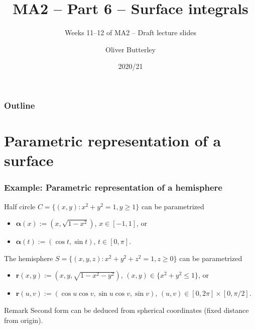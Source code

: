 \documentclass[aspectratio=169]{beamer}
\title{MA2 -- Part 6 -- Surface integrals}
\subtitle{Weeks 11--12 of MA2 -- Draft lecture slides}
\author[]{Oliver Butterley}
\institute{University of Rome Tor Vergata}
\date{2020/21}
\newcommand{\rr}{\mathbf{r}}
\newcommand{\aalpha}{\boldsymbol{\alpha}}
\newcommand{\cover}[1]{{#1}}
\begin{document}
\frame{\titlepage}

\begin{frame}
    \frametitle{Outline}
    \tableofcontents
\end{frame}


\section{Parametric representation of a surface}

\begin{frame}
    \frametitle{Example: Parametric representation of a hemisphere}


    Half circle \(C=\{(x,y): x^2 + y^2=1, y\geq 1\}\) can be parametrized
    \begin{itemize}
        \item \(\aalpha(x):= (x,\sqrt{1-x^2})\), \(x\in [-1,1]\), or
        \item \(\aalpha(t):= (\cos t, \sin t)\), \(t\in [0,\pi]\).
    \end{itemize}

    \vspace{2em}

    \begin{example}[hemisphere]
        The hemisphere \(S = \{(x,y,z): x^2+y^2+z^2=1, z\geq 0\}\) can be parametrized
        \begin{itemize}
            \item \(\rr(x,y):=(x,y,\cover{\sqrt{1-x^2 -y^2}})\), \((x,y)\in\{x^2+y^2 \leq 1\}\), or
            \item \(\rr(u,v):=({\cos u \cos v}, {\sin u \cos v}, \cover{\sin v})\), \((u,v)\in  [0,2\pi] \times [0,\pi/2]\).
        \end{itemize}
    \end{example}

    \begin{block}{Remark}
        Second form can be deduced from spherical coordinates (fixed distance from origin).
    \end{block}


\end{frame}
\end{document}
